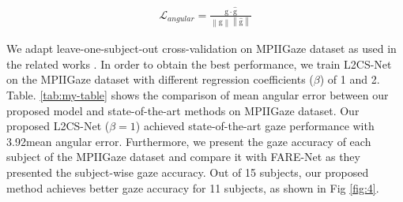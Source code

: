 \documentclass{article}
\begin{document}
\begin{align*}
\mathcal{L}_{angular} = \frac{\mathrm{g}\cdot \mathrm{\hat{g}}}{\left \|\mathrm{g}\right \|  \left \| \mathrm{\hat{g}} \right \|}
\end{align*}


We adapt leave-one-subject-out cross-validation on MPIIGaze dataset as used in the related works \cite{Mpiigaze1,ca-net,cvpr2021}. In order to obtain the best performance, we train L2CS-Net on the MPIIGaze dataset with different regression coefficients ($\beta$) of 1 and 2. Table. \ref{tab:my-table} shows the comparison of mean angular error between our proposed model and state-of-the-art methods on MPIIGaze dataset. Our proposed L2CS-Net ($\beta=1$) achieved state-of-the-art gaze performance with 3.92\degree mean angular error. Furthermore, we present the gaze accuracy of each subject of the MPIIGaze dataset and compare it with FARE-Net \cite{farenet} as they presented the subject-wise gaze accuracy. Out of 15 subjects, our proposed method achieves better gaze accuracy for 11 subjects, as shown in Fig \ref{fig:4}. 
\end{document}
